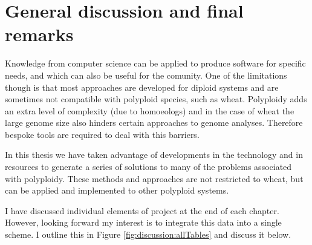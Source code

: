 
\chapter{General discussion and final remarks}
\label{cha:discussion}



Knowledge from  computer science can be applied to produce software for specific needs, and which can also be useful for the comunity. 
One of the limitations though is that most approaches are developed for diploid systems and are sometimes not compatible with polyploid species, such as wheat. 
Polyploidy adds an extra level of complexity (due to homoeologs) and in the case of wheat the large genome size also hinders certain approaches to genome analyses. Therefore bespoke tools are required to deal with this barriers. 

In this thesis we have taken advantage of developments in the technology and in resources to generate a series of solutions to many of the problems associated with polyploidy. These methods and approaches are not restricted to wheat, but can be applied and implemented to other polyploid systems.

I have discussed individual elements of project at the end of each chapter. However, looking forward my interest is to integrate this data into a single scheme. I outline this in Figure \ref{fig:discussion:allTables} and discuss it below. 

